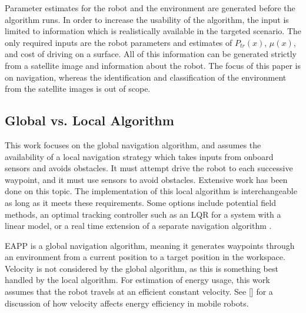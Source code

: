 \documentclass[journal]{IEEEtran}
\begin{document}
Parameter estimates for the robot and the environment are generated  before the algorithm runs. 
In order to increase the usability of the algorithm, the input is limited to information which is realistically available in the targeted scenario. 
The only required inputs are the robot parameters and estimates of $P_{tr}(x)$, $\mu(x)$, and cost of driving on a surface. All of this information can be generated strictly from a satellite image and information about the robot. 
The focus of this paper is on navigation, whereas the identification and classification of the environment from the satellite images is out of scope.

\subsection{Global vs. Local Algorithm}
This work focuses on the global navigation algorithm, and assumes the availability of a local navigation strategy which takes inputs from onboard sensors and avoids obstacles. 
It must attempt drive the robot to each successive waypoint, and it must use sensors to avoid obstacles. 
Extensive work\cite{siegwart2011introduction} has been done on this topic. 
The implementation of this local algorithm is interchangeable as long as it meets these requirements. Some options include potential field methods, an optimal tracking controller such as an LQR for a system with a linear model, or a real time extension of a separate navigation algorithm \cite{bruce2002real}.

EAPP is a global navigation algorithm, meaning it generates waypoints through an environment from a current position to a target position in the workspace. 
Velocity is not considered by the global algorithm, as this is something best handled by the local algorithm. For estimation of energy usage, this work assumes that the robot travels at an efficient constant velocity.
See [\cite{(Mei et al., Deployment of mobile robots with energy and timing constraints)}] for a discussion of how velocity affects energy efficiency in mobile robots.
\end{document}

